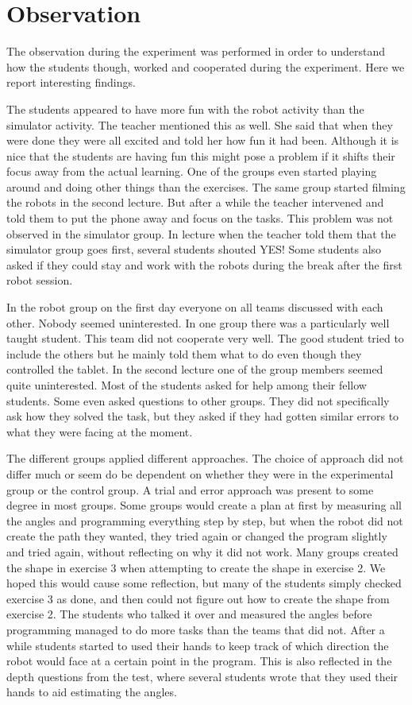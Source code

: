 \chapter{Observation}
The observation during the experiment was performed in order to understand how the students though, worked and cooperated during the experiment. Here we report interesting findings.

\bigskip\noindent
The students appeared to have more fun with the robot activity than the simulator activity. The teacher mentioned this as well. She said that when they were done they were all excited and told her how fun it had been. Although it is nice that the students are having fun this might pose a problem if it shifts their focus away from the actual learning. One of the groups even started playing around and doing other things than the exercises. The same group started filming the robots in the second lecture. But after a while the teacher intervened and told them to put the phone away and focus on the tasks. This problem was not observed in the simulator group. In lecture when the teacher told them that the simulator group goes first, several students shouted YES! Some students also asked if they could stay and work with the robots during the break after the first robot session. 

\bigskip\noindent
In the robot group on the first day everyone on all teams discussed with each other. Nobody seemed uninterested. In one group there was a particularly well taught student. This team did not cooperate very well. The good student tried to include the others but he mainly told them what to do even though they controlled the tablet. In the second lecture one of the group members seemed quite uninterested. Most of the students asked for help among their fellow students. Some even asked questions to other groups. They did not specifically ask how they solved the task, but they asked if they had gotten similar errors to what they were facing at the moment.

\bigskip\noindent
The different groups applied different approaches. The choice of approach did not differ much or seem do be dependent on whether they were in the experimental group or the control group. A trial and error approach was present to some degree in most groups. Some groups would create a plan at first by measuring all the angles and programming everything step by step, but when the robot did not create the path they wanted, they tried again or changed the program slightly and tried again, without reflecting on why it did not work. Many groups created the shape in exercise 3 when attempting to create the shape in exercise 2. We hoped this would cause some reflection, but many of the students simply checked exercise 3 as done, and then could not figure out how to create the shape from exercise 2. The students who talked it over and measured the angles before programming managed to do more tasks than the teams that did not. After a while students started to used their hands to keep track of which direction the robot would face at a certain point in the program. This is also reflected in the depth questions from the test, where several students wrote that they used their hands to aid estimating the angles.

